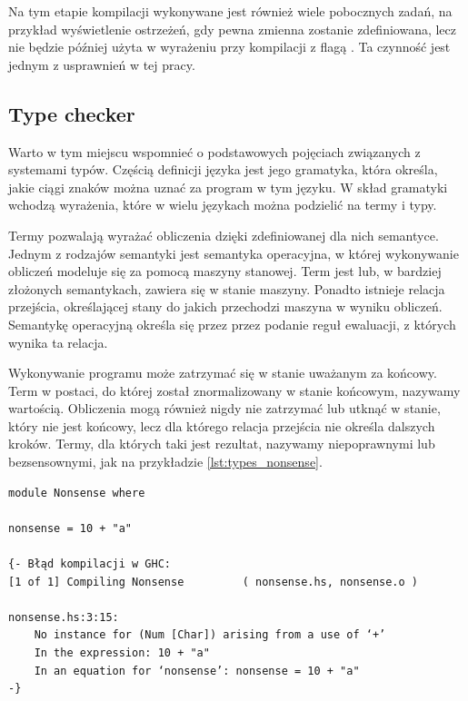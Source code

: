 {Na tym etapie kompilacji wykonywane jest również wiele pobocznych zadań, na
przykład wyświetlenie ostrzeżeń, gdy pewna zmienna zostanie zdefiniowana, lecz
nie będzie później użyta w wyrażeniu przy kompilacji z flagą
. Ta czynność jest jednym z usprawnień w tej pracy.

\subsection{Type checker}\label{sec:type_checker}

Warto w tym miejscu wspomnieć o podstawowych pojęciach związanych z systemami
typów. Częścią definicji języka jest jego gramatyka, która określa, jakie ciągi
znaków można uznać za program w tym języku. W skład gramatyki wchodzą wyrażenia,
które w wielu językach można podzielić na termy i typy.

Termy pozwalają wyrażać obliczenia dzięki zdefiniowanej dla nich semantyce.
Jednym z rodzajów semantyki jest semantyka operacyjna, w której wykonywanie
obliczeń modeluje się za pomocą maszyny stanowej. Term jest lub, w bardziej
złożonych semantykach, zawiera się w stanie maszyny. Ponadto istnieje relacja
przejścia, określającej stany do jakich przechodzi maszyna w wyniku obliczeń.
Semantykę operacyjną określa się przez przez podanie reguł ewaluacji, z których
wynika ta relacja.

Wykonywanie programu może zatrzymać się w stanie uważanym za końcowy. Term
w postaci, do której został znormalizowany w stanie końcowym, nazywamy wartością.
Obliczenia mogą również nigdy nie zatrzymać lub utknąć w stanie, który nie jest
końcowy, lecz dla którego relacja przejścia nie określa dalszych kroków.
Termy, dla których taki jest rezultat, nazywamy niepoprawnymi lub
bezsensownymi\cite{TAPL}, jak na przykładzie \ref{lst:types_nonsense}.

\begin{lstlisting}[float,label={lst:types_nonsense},
                   caption={Przykład bezsensownego wyrażenia w programie, z błędem GHC, który wywołuje.}]
module Nonsense where

nonsense = 10 + "a"

{- Błąd kompilacji w GHC:
[1 of 1] Compiling Nonsense         ( nonsense.hs, nonsense.o )

nonsense.hs:3:15:
    No instance for (Num [Char]) arising from a use of ‘+’
    In the expression: 10 + "a"
    In an equation for ‘nonsense’: nonsense = 10 + "a"
-}
\end{lstlisting}

}

